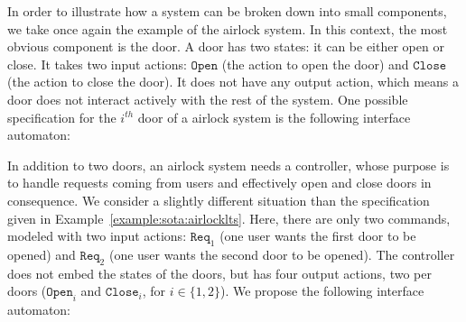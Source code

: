 \begin{example}
  \label{example:sota:airlockinterface}

  In order to illustrate how a system can be broken down into small components,
  we take once again the example of the airlock system.
  In this context, the most obvious component is the door.
  A door has two states: it can be either open or close.
  It takes two input actions: \( \mathtt{Open} \) (the action to open the door)
  and \( \mathtt{Close} \) (the action to close the door).
  It does not have any output action, which means a door does not interact
  actively with the rest of the system.
  One possible specification for the \( i^{th} \) door of a airlock system is
  the following interface automaton:

  \begin{center}
  \end{center}

  In addition to two doors, an airlock system needs a controller, whose purpose
  is to handle requests coming from users and effectively open and close doors
  in consequence.
  We consider a slightly different situation than the specification given in
  Example~\ref{example:sota:airlocklts}.
  Here, there are only two commands, modeled with two input actions:
  \( \mathtt{Req}_1 \) (one user wants the first door to be opened) and
  \( \mathtt{Req}_2 \) (one user wants the second door to be opened).
  The controller does not embed the states of the doors, but has four output
  actions, two per doors (\( \mathtt{Open}_i \) and \( \mathtt{Close}_i\), for
  \( i \in \{1, 2\}\)).
  We propose the following interface automaton:


\end{example}

